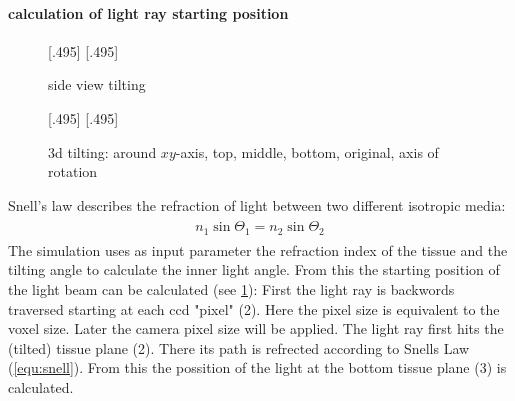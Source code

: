 \paragraph{calculation of light ray starting position}
% 
\begin{figure}[!t]
\def\tikzwidth{0.42\textwidth}
% 
[.495\textwidth]{
\def\tilt{0}
\def\nindex{2.25}
}
% 
[.495\textwidth]{
\def\tilt{20}
\def\nindex{2.25}
}
\caption{side view tilting}
\label{fig:tilted_side_view}
\end{figure}
% 
\begin{figure}[!t]
% 
\def\tikzheight{0.42\textwidth}
\def\azimuth{0}
\def\elevation{90}
\def\dz{2}
[.495\textwidth]{
}
% 
\def\azimuth{20}
\def\elevation{25}
\def\dz{1}
[.495\textwidth]{
}
% 
\caption[3d tilting]{3d tilting: around $xy$-axis, \raisebox{.25em}{\tikz \draw[red,thick](0,0)--(0.25,0);} top, \raisebox{.25em}{\tikz \draw[green!50!black,thick](0,0)--(0.25,0);} middle, \raisebox{.25em}{\tikz \draw[blue,thick](0,0)--(0.25,0);} bottom, \raisebox{.25em}{\tikz \draw[dash pattern=on 1.25pt off 1.25pt,thick](0,0)--(0.25,0);} original, \raisebox{.25em}{\tikz \draw[gray](0,0)--(0.25,0);} axis of rotation }
\end{figure}
% 
Snell's law describes the refraction of light between two different isotropic media:
\begin{align}
\begin{split}
    n_1 \sin{\Theta_1} = n_2 \sin{\Theta_2}
\end{split}
\label{equ:snell}
\end{align}
% 
The simulation uses as input parameter the refraction index of the tissue and the tilting angle to calculate the inner light angle.
From this the starting position of the light beam can be calculated (see \cref{fig:tilted_side_view}):
% 
First the light ray is backwords traversed starting at each ccd "pixel" (2).
Here the pixel size is equivalent to the voxel size.
Later the camera pixel size will be applied.
The light ray first hits the (tilted) tissue plane (2).
There its path is refrected according to Snells Law (\cref{equ:snell}).
From this the possition of the light at the bottom tissue plane (3) is calculated.
